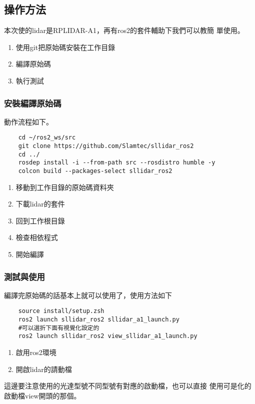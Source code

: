 
\subsection{操作方法}

本次使的lidar是RPLIDAR-A1，再有ros2的套件輔助下我們可以教簡
單使用。
\begin{enumerate}
    \item 使用git把原始碼安裝在工作目錄
    \item 編譯原始碼
    \item 執行測試
\end{enumerate}
\subsubsection{安裝編譯原始碼}
動作流程如下。
\begin{tcolorbox}
\begin{verbatim}
    cd ~/ros2_ws/src
    git clone https://github.com/Slamtec/sllidar_ros2
    cd ../ 
    rosdep install -i --from-path src --rosdistro humble -y
    colcon build --packages-select sllidar_ros2
\end{verbatim}
\end{tcolorbox}
\begin{enumerate}
    \item 移動到工作目錄的原始碼資料夾
    \item 下載lidar的套件
    \item 回到工作根目錄
    \item 檢查相依程式
    \item 開始編譯
\end{enumerate}
\subsubsection{測試與使用}
編譯完原始碼的話基本上就可以使用了，使用方法如下
\begin{tcolorbox}
\begin{verbatim}
    source install/setup.zsh    
    ros2 launch sllidar_ros2 sllidar_a1_launch.py
    #可以選折下面有視覺化設定的
    ros2 launch sllidar_ros2 view_sllidar_a1_launch.py
\end{verbatim}
\end{tcolorbox}
\begin{enumerate}
    \item 啟用ros2環境
    \item 開啟lidar的請動檔
\end{enumerate}
這邊要注意使用的光達型號不同型號有對應的啟動檔，也可以直接
使用可是化的啟動檔view開頭的那個。
